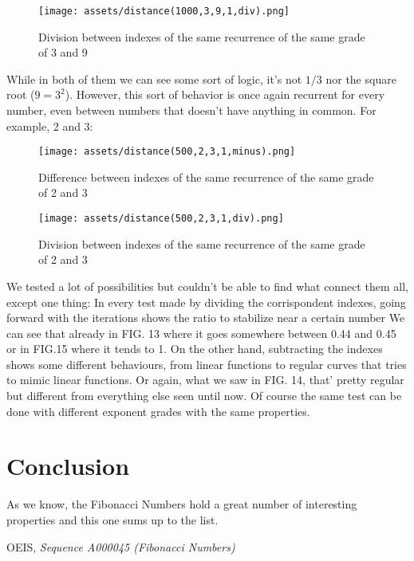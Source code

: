 \documentclass[amsmath,amssymb,aps,pra,reprint,groupedaddress,showpacs]{revtex4-1}
\begin{document}
\begin{figure}[H]
\centering
\texttt{[image: assets/distance(1000,3,9,1,div).png]}
\caption{Division between indexes of the same recurrence of the same grade of 3 and 9}
\end{figure}

While in both of them we can see some sort of logic, it's not $1/3$ nor the square root ($9 = 3^2$).
However, this sort of behavior is once again recurrent for every number, even between numbers that doesn't have anything in common.
For example, 2 and 3:

\begin{figure}[H]
\centering
\texttt{[image: assets/distance(500,2,3,1,minus).png]}
\caption{Difference between indexes of the same recurrence of the same grade of 2 and 3}
\end{figure}

\begin{figure}[H]
\centering
\texttt{[image: assets/distance(500,2,3,1,div).png]}
\caption{Division between indexes of the same recurrence of the same grade of 2 and 3}
\end{figure}

We tested a lot of possibilities but couldn't be able to find what connect them all, except one thing:
In every test made by dividing the corrispondent indexes, going forward with the iterations shows the ratio to stabilize near a certain number
We can see that already in FIG. 13 where it goes somewhere between 0.44 and 0.45 or in FIG.15 where it tends to 1.
On the other hand, subtracting the indexes shows some different behaviours, from linear functions to regular curves that tries to mimic linear functions.
Or again, what we saw in FIG. 14, that' pretty regular but different from everything else seen until now.
Of course the same test can be done with different exponent grades with the same properties.

\section{Conclusion}

As we know, the Fibonacci Numbers hold a great number of interesting properties and this one sums up to the list.

\begin{thebibliography}{24}
 
{OEIS},
\textit{Sequence A000045 (Fibonacci Numbers)}

\end{thebibliography}
\end{document}
